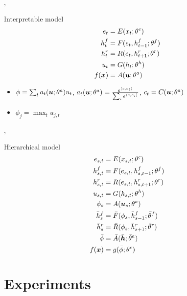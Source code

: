 \begin{frame}{\maxi, \softmaxi}
  \begin{block}{Interpretable model}
    \begin{align*}
  e_t &= E(x_t;\theta^e)\\
  h^f_t &= F(e_t,h^f_{t-1};\theta^f)\\
  h^r_t &= R(e_t,h^r_{t+1};\theta^r)\\
  u_t &= G(h_t;\theta^h)\\
  f(\bm{x}) &= A(\bm{u};\theta^a)
\end{align*}
  \end{block}
  \begin{itemize}
  \item
    $\phi = \sum_t a_t(\bm{u};\theta^a) u_t$, $a_t(\bm{u};\theta^a) = \frac{e^{\langle c, c_t\rangle}}
    {\sum_i{e^{\langle c, c_i\rangle}}}$, $c_t=C(\bm{u};\theta^a)$
\item $\phi_j = \max_t u_{j,t}$
\end{itemize}
\end{frame}

\begin{frame}{\maxh, \softmaxh}
  \begin{block}{Hierarchical model}
    \begin{align*}
  e_{s,t} &= E(x_{s,t};\theta^e)\\
  h^f_{s,t} &= F(e_{s,t},h^f_{s,t-1};\theta^{f})\\
  h^r_{s,t} &= R(e_{s,t},h^r_{s,t+1};\theta^{r})\\
  u_{s,t} &= G(h_{s,t};\theta^{h})\\
  \phi_s &= A(\bm{u}_s;\theta^{a})\\
  \bar{h}^{f}_{s} &= \bar{F}(\phi_{s},\bar{h}^{f}_{s-1};\bar{\theta}^{f})\\
  \bar{h}^{r}_{s} &= \bar{R}(\phi_{s},\bar{h}^{r}_{s+1};\bar{\theta}^{r})\\
  \bar{\phi} &= \bar{A}(\bar{\bm{h}};\bar{\theta}^{a})\\
  f(\bm{x}) &= g(\bar{\phi};\theta^c)
\end{align*}
  \end{block}
\end{frame}

\section{Experiments}



